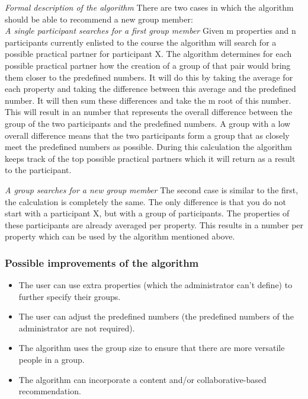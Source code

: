 \emph{Formal description of the algorithm}
There are two cases in which the algorithm should be able to recommend a new group member:\\
\emph{A single participant searches for a first group member}
Given m properties and n participants currently enlisted to the course the algorithm will search for a possible practical partner for participant X.
The algorithm determines for each possible practical partner how the creation of a group of that pair would bring them closer to the predefined numbers.
It will do this by taking the average for each property and taking the difference between this average and the predefined number.
It will then sum these differences and take the m root of this number.
This will result in an number that represents the overall difference between the group of the two participants and the predefined numbers.
A group with a low overall difference means that the two participants form a group that as closely meet the predefined numbers as possible.
During this calculation the algorithm keeps track of the top possible practical partners which it will return as a result to the participant.

\emph{A group searches for a new group member}
The second case is similar to the first, the calculation is completely the same.
The only difference is that you do not start with a participant X, but with a group of participants.
The properties of these participants are already averaged per property.
This results in a number per property which can be used by the algorithm mentioned above.

\subsubsection*{Possible improvements of the algorithm}
\begin{itemize}
\item The user can use extra properties (which the administrator can't define) to further specify their groups.
\item The user can adjust the predefined numbers (the predefined numbers of the administrator are not required).
\item The algorithm uses the group size to ensure that there are more versatile people in a group.
\item The algorithm can incorporate a content and/or collaborative-based recommendation.
\end{itemize}